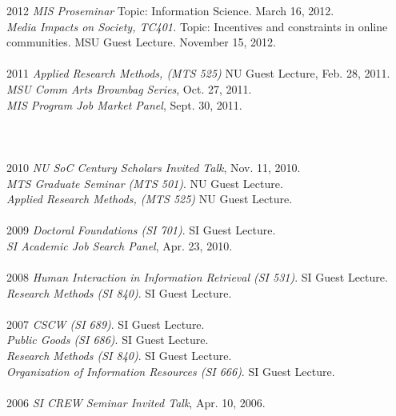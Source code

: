 \documentclass[9pt]{extarticle}
\begin{document}
\begin{tabbing}
2012 \hspace{0.3in}\=  \emph{MIS Proseminar} Topic: Information Science. March 16, 2012.\\
\> \emph{Media Impacts on Society, TC401.} Topic: Incentives and constraints in online \\
\> \hspace{0.5cm} communities. MSU Guest Lecture. November 15, 2012. \\\\

2011 \hspace{0.3in}\= \emph{Applied Research Methods, (MTS 525)} NU Guest Lecture, Feb. 28, 2011. \\
\> \emph{MSU Comm Arts Brownbag Series}, Oct. 27, 2011. \\
\> \emph{MIS Program Job Market Panel}, Sept. 30, 2011. \\\\\\\\

2010 \hspace{0.3in}\= \emph{NU SoC Century Scholars Invited Talk}, Nov. 11, 2010. \\
\> \emph{MTS Graduate Seminar (MTS 501)}. NU Guest Lecture. \\
\> \emph{Applied Research Methods, (MTS 525)} NU Guest Lecture. \\\\

2009 \hspace{0.3in}\= \emph{Doctoral Foundations (SI 701)}. SI Guest Lecture. \\
\> \emph{SI Academic Job Search Panel}, Apr. 23, 2010. \\\\

2008 \hspace{0.3in}\= \emph{Human Interaction in Information Retrieval (SI 531)}. SI Guest Lecture. \\
\> \emph{Research Methods (SI 840)}. SI Guest Lecture. \\\\

2007 \hspace{0.3in}\= \emph{CSCW (SI 689)}. SI Guest Lecture. \\
\> \emph{Public Goods (SI 686)}. SI Guest Lecture. \\
\> \emph{Research Methods (SI 840)}. SI Guest Lecture. \\
\> \emph{Organization of Information Resources (SI 666)}. SI Guest Lecture. \\\\

2006 \hspace{0.3in}\= \emph{SI CREW Seminar Invited Talk}, Apr. 10, 2006. \\
\end{tabbing}
\end{document}
